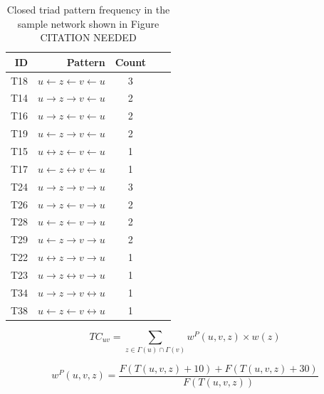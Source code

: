 \begin{table}[t]
\caption{Closed triad pattern frequency in the sample network shown in Figure CITATION NEEDED}
\label{sample_network_freq}
\vskip 0.15in
\begin{center}
\begin{small}
\begin{sc}
\begin{tabular}{rrccr}
\hline
ID & Pattern & Count \\
\hline
T18 & $u \leftarrow z \leftarrow v \leftarrow u$ & 3 \\
T14 & $u \rightarrow z \rightarrow v \leftarrow u$ & 2 \\
T16 & $u \rightarrow z \leftarrow v \leftarrow u$ & 2 \\
T19 & $u \leftarrow z \rightarrow v \leftarrow u$ & 2 \\
T15 & $u \leftrightarrow z \leftarrow v \leftarrow u$ & 1 \\
T17 & $u \leftarrow z \leftrightarrow v \leftarrow u$ & 1 \\
T24 & $u \rightarrow z \rightarrow v \rightarrow u$ & 3 \\
T26 & $u \rightarrow z \leftarrow v \rightarrow u$ & 2 \\
T28 & $u \leftarrow z \leftarrow v \rightarrow u$ & 2 \\
T29 & $u \leftarrow z \rightarrow v \rightarrow u$ & 2 \\
T22 & $u \leftrightarrow z \rightarrow v \rightarrow u$ & 1 \\
T23 & $u \rightarrow z \leftrightarrow v \rightarrow u$ & 1 \\
T34 & $u \rightarrow z \rightarrow v \leftrightarrow u$ & 1 \\
T38 & $u \leftarrow z \leftarrow v \leftrightarrow u$ & 1 \\
\hline
\end{tabular}
\end{sc}
\end{small}
\end{center}
\vskip -0.1in
\end{table}

\begin{equation}
TC_{uv} = \sum_{z\in \Gamma(u)\cap \Gamma(v)} w^{P}(u, v, z) \times w(z)  
\end{equation}

\begin{equation}
w^{P}(u,v,z) = \frac{F(T(u,v,z) + 10) + F(T(u,v,z) + 30)}{F(T(u,v,z))}
\end{equation}

